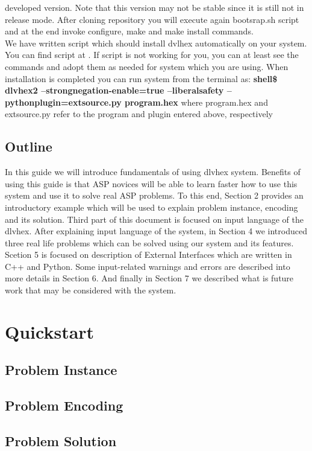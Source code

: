 \documentclass[14pt,a4paper, titlepage]{article}
\begin{document}
developed version. Note that this version may not be stable since it is still not in release mode. After cloning repository you will execute again bootsrap.sh script and at the end invoke configure, make and make install commands.\bigskip \\We have written script which should install dvlhex automatically on your system. You can find script at \cite{script}. If script is not working for you, you can at least see the commands and adopt them as needed for system which you are using. When installation is completed you can run system from the terminal as: 
\textbf{shell\$ dlvhex2 --strongnegation-enable=true --liberalsafety --pythonplugin=extsource.py program.hex}
where program.hex and extsource.py refer to the program and plugin entered above, respectively    

\subsection{Outline}
In this guide we will introduce fundamentals of using dlvhex system. Benefits of using this guide is that ASP novices will be able to learn faster how to use this system and use it to solve real ASP problems. To this end, Section 2 provides an introductory example which will be used to explain problem instance, encoding and its solution. Third part of this document is focused on input language of the dlvhex. After explaining input language of the system, in Section 4 we introduced three real life problems which can be solved using our system and its features. Scetion 5 is focused on description of External Interfaces which are written in C++ and Python. Some input-related warnings and errors are described into more details in Section 6. And finally in Section 7 we described what is future work that may be considered with the system.      

\newpage
\section{Quickstart} %
\subsection{Problem Instance}
\subsection{Problem Encoding}
\subsection{Problem Solution}
\end{document}

